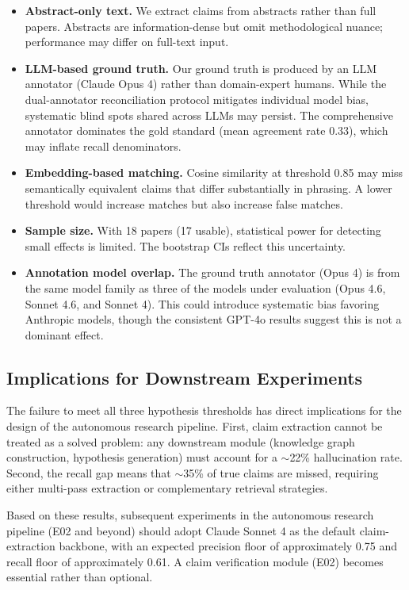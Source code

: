 \documentclass[11pt,a4paper]{article}
\begin{document}
\begin{itemize}
  \item \textbf{Abstract-only text.}  We extract claims from abstracts
    rather than full papers.  Abstracts are information-dense but omit
    methodological nuance; performance may differ on full-text input.
  \item \textbf{LLM-based ground truth.}  Our ground truth is produced by
    an LLM annotator (Claude Opus 4) rather than domain-expert humans.
    While the dual-annotator reconciliation protocol mitigates individual
    model bias, systematic blind spots shared across LLMs may persist.
    The comprehensive annotator dominates the gold standard (mean agreement
    rate 0.33), which may inflate recall denominators.
  \item \textbf{Embedding-based matching.}  Cosine similarity at threshold
    0.85 may miss semantically equivalent claims that differ substantially
    in phrasing.  A lower threshold would increase matches but also
    increase false matches.
  \item \textbf{Sample size.}  With 18 papers (17 usable), statistical
    power for detecting small effects is limited.  The bootstrap CIs
    reflect this uncertainty.
  \item \textbf{Annotation model overlap.}  The ground truth annotator
    (Opus 4) is from the same model family as three of the models under
    evaluation (Opus 4.6, Sonnet 4.6, and Sonnet 4).  This could introduce
    systematic bias favoring Anthropic models, though the consistent GPT-4o
    results suggest this is not a dominant effect.
\end{itemize}

\subsection{Implications for Downstream Experiments}

The failure to meet all three hypothesis thresholds has direct implications
for the design of the autonomous research pipeline.  First, claim
extraction cannot be treated as a solved problem: any downstream module
(knowledge graph construction, hypothesis generation) must account for a
$\sim$22\% hallucination rate.  Second, the recall gap means that
$\sim$35\% of true claims are missed, requiring either multi-pass
extraction or complementary retrieval strategies.

Based on these results, subsequent experiments in the autonomous research
pipeline (E02 and beyond) should adopt Claude Sonnet 4 as the default
claim-extraction backbone, with an expected precision floor of
approximately 0.75 and recall floor of approximately 0.61.  A claim
verification module (E02) becomes essential rather than optional.
\end{document}

